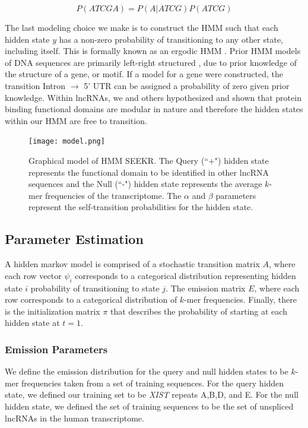 $$P(ATCGA) = P(A|ATCG)P(ATCG)$$

The last modeling choice we make is to construct the HMM such that each hidden state $y$ has a non-zero probability of transitioning to any other state, including itself. This is formally known as an ergodic HMM \cite{Rabiner1989ARecognition}. Prior HMM models of DNA sequences are primarily left-right structured \cite{Burge1997PredictionDNA,Pachter2002ApplicationsProblems,Henderson1997FindingModel,Wheeler2013Nhmmer:HMMs}, due to prior knowledge of the structure of a gene, or motif. If a model for a gene were constructed, the transition Intron $\rightarrow$ 5' UTR can be assigned a probability of zero given prior knowledge. Within lncRNAs, we and others hypothesized and shown that protein binding functional domains are modular in nature and therefore the hidden states within our HMM are free to transition.

\begin{figure}[h]
\centering
\texttt{[image: model.png]}
\caption[Graphical model of \emph{hmmSEEKR}]{Graphical model of HMM SEEKR. The Query (``+") hidden state represents the functional domain to be identified in other lncRNA sequences and the Null (``-") hidden state represents the average $k$-mer frequencies of the transcriptome. The $\alpha$ and $\beta$ parameters represent the self-transition probabilities for the hidden state. }
\label{fig:hmmseekrmodel}
\end{figure}

\subsection{Parameter Estimation}
A hidden markov model is comprised of a stochastic transition matrix $A$, where each row vector $\psi_i$ corresponds to a categorical distribution representing hidden state $i$ probability of transitioning to state $j$. The emission matrix $E$, where each row corresponds to a categorical distribution of $k$-mer frequencies. Finally, there is the initialization matrix $\pi$ that describes the probability of starting at each hidden state at $t=1$.
\subsubsection{Emission Parameters}
We define the emission distribution for the query and null hidden states to be $k$-mer frequencies taken from a set of training sequences. For the query hidden state, we defined our training set to be \emph{XIST} repeats A,B,D, and E. For the null hidden state, we defined the set of training sequences to be the set of unspliced lncRNAs in the human transcriptome. 

